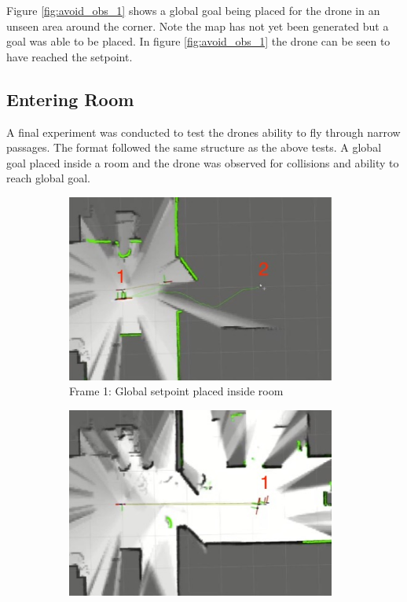\documentclass[capstone_report.tex]{subfiles}
\begin{document}
Figure \ref{fig:avoid_obs_1} shows a global goal being placed for the drone in an unseen area around the corner.  Note the map has not yet been generated but a goal was able to be placed.  In figure \ref{fig:avoid_obs_1} the drone can be seen to have reached the setpoint.

\subsection{Entering Room}

A final experiment was conducted to test the drones ability to fly through narrow passages.  The format followed the same structure as the above tests.  A global goal placed inside a room and the drone was observed for collisions and ability to reach global goal.

\begin{figure}[H]
    \centering
    \begin{subfigure}[b]{0.5\textwidth}
        \centering
        \includegraphics[width=0.97\textwidth]{./imgs/entering_room/an_frame_1.jpg}
        \caption{Frame 1: Global setpoint placed inside room}
        \label{fig:enter_room_1}
    \end{subfigure}%
    \begin{subfigure}[b]{0.5\textwidth}
        \centering
        \includegraphics[width=0.97\textwidth]{./imgs/entering_room/an_frame_2.jpg}

\end{subfigure}
\end{figure}
\end{document}
